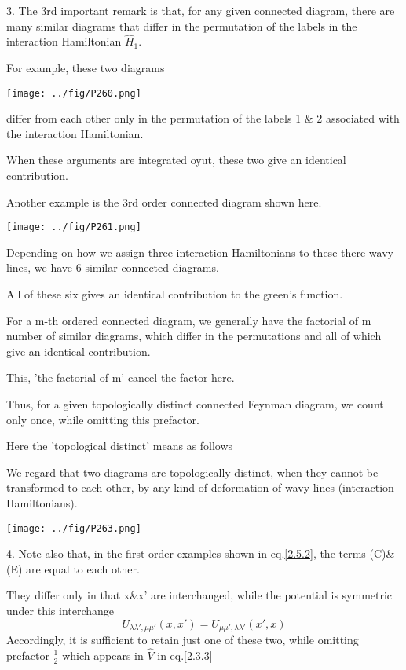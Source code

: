 3. The 3rd important remark is that, for any given connected diagram, there are many similar diagrams that differ in the permutation of the labels in the interaction Hamiltonian $\hat H_1$.

For example, these two diagrams 
\begin{center}
\texttt{[image: ../fig/P260.png]}
\end{center}
differ from each other only in the permutation of the labels 1 \& 2 associated with the interaction Hamiltonian.

When these arguments are integrated oyut, these two give an identical contribution.

Another example is the 3rd order connected diagram shown here.
\begin{center}
\texttt{[image: ../fig/P261.png]}
\end{center}
Depending on how we assign three interaction Hamiltonians to these there wavy lines, we have 6 similar connected diagrams.

All of these six gives an identical contribution to the green's function.

For a m-th ordered connected diagram, we generally have the factorial of m number of similar diagrams, which differ in the permutations and all of which give an identical contribution.

This, 'the factorial of m' cancel the factor here.

Thus, for a given topologically distinct connected Feynman diagram, we count only once, while omitting this prefactor.

Here the 'topological distinct' means as follows

We regard that two diagrams are topologically distinct, when they cannot be transformed to each other, by any kind of deformation of wavy lines (interaction Hamiltonians).
\begin{center}
\texttt{[image: ../fig/P263.png]}
\end{center}
4. Note also that, in the first order examples shown in eq.\eqref{2.5.2}, the terms (C)\&(E) are equal to each other.

They differ only in that x\&x' are interchanged, while the potential is symmetric under this interchange
$$U_{\lambda\lambda',\mu\mu'}(x,x')=U_{\mu\mu',\lambda\lambda'}(x',x)$$
Accordingly, it is sufficient to retain just one of these two, while omitting prefactor $\frac{1}{2}$ which appears in $\hat V$ in eq.\eqref{2.3.3}


